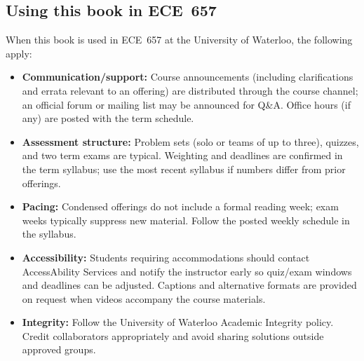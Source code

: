 \subsection{Using this book in ECE~657}\label{app:ece657_using_this_book}
When this book is used in ECE~657 at the University of Waterloo, the following apply:
\begin{itemize}
    \item \textbf{Communication/support:} Course announcements (including clarifications and errata relevant to an offering) are distributed through the course channel; an official forum or mailing list may be announced for Q\&A. Office hours (if any) are posted with the term schedule.
    \item \textbf{Assessment structure:} Problem sets (solo or teams of up to three), quizzes, and two term exams are typical. Weighting and deadlines are confirmed in the term syllabus; use the most recent syllabus if numbers differ from prior offerings.
    \item \textbf{Pacing:} Condensed offerings do not include a formal reading week; exam weeks typically suppress new material. Follow the posted weekly schedule in the syllabus.
    \item \textbf{Accessibility:} Students requiring accommodations should contact AccessAbility Services and notify the instructor early so quiz/exam windows and deadlines can be adjusted. Captions and alternative formats are provided on request when videos accompany the course materials.
    \item \textbf{Integrity:} Follow the University of Waterloo Academic Integrity policy. Credit collaborators appropriately and avoid sharing solutions outside approved groups.
\end{itemize}
